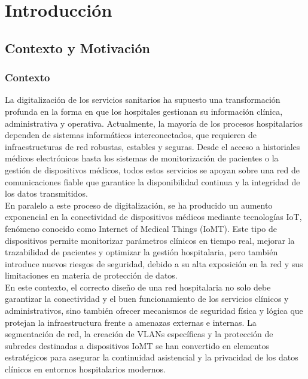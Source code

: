 
\chapter{Introducción}

\section{Contexto y Motivación}
\subsection{Contexto}
La digitalización de los servicios sanitarios ha supuesto una transformación profunda en la forma en que los hospitales gestionan su información clínica, administrativa y 
operativa. Actualmente, la mayoría de los procesos hospitalarios dependen de sistemas informáticos interconectados, que requieren de infraestructuras de red robustas, estables 
y seguras. Desde el acceso a historiales médicos electrónicos hasta los sistemas de monitorización de pacientes o la gestión de dispositivos médicos, todos estos servicios 
se apoyan sobre una red de comunicaciones fiable que garantice la disponibilidad continua y la integridad de los datos transmitidos. \\

En paralelo a este proceso de digitalización, se ha producido un aumento exponencial en la conectividad de dispositivos médicos mediante tecnologías \acs{IoT}, fenómeno conocido 
como Internet of Medical Things (\acs{IoMT}). Este tipo de dispositivos permite monitorizar parámetros clínicos en tiempo real, mejorar la trazabilidad de pacientes y optimizar 
la gestión hospitalaria, pero también introduce nuevos riesgos de seguridad, debido a su alta exposición en la red y sus limitaciones en materia de protección de datos. \\

En este contexto, el correcto diseño de una red hospitalaria no solo debe garantizar la conectividad y el buen funcionamiento de los servicios clínicos y administrativos, 
sino también ofrecer mecanismos de seguridad física y lógica que protejan la infraestructura frente a amenazas externas e internas. La segmentación de red, la creación de 
\acs{VLAN}s específicas y la protección de subredes destinadas a dispositivos \acs{IoMT} se han convertido en elementos estratégicos para asegurar la continuidad asistencial y la 
privacidad de los datos clínicos en entornos hospitalarios modernos.

